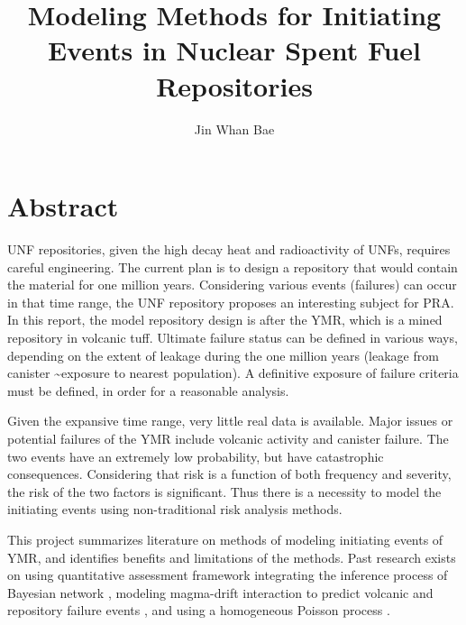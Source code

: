 \documentclass[12pt]{article}
\title{Modeling Methods for Initiating Events in Nuclear Spent Fuel Repositories}
\author{Jin Whan Bae}
\affil{Dept. of Nuclear, Plasma, and Radiological Engineering, University of Illinois at Urbana-Champaign
		  Urbana, IL}
\date{}                     %
\begin{document}
\maketitle

\section{Abstract}
\gls{UNF} repositories, given the high decay heat and radioactivity
of \glspl{UNF}, requires careful engineering. The current plan is
to design a repository that would contain the material for one million years.
Considering various events (failures) can occur in that time range,
the \gls{UNF} repository proposes an interesting subject for
\gls{PRA}. In this report, the model repository design is after the 
\gls{YMR}, which is a mined repository in volcanic tuff.
Ultimate failure status can be defined in various ways, depending on the
extent of leakage during the one million years (leakage from canister
\textasciitilde exposure to nearest population).
A definitive exposure of failure criteria must be defined,
in order for a reasonable analysis.  

Given the expansive
time range, very little real data is available.
Major issues or potential failures of the \gls{YMR} include volcanic activity
and canister failure. The two events have an extremely low
probability, but have catastrophic consequences. Considering that
risk is a function of both frequency and severity, the risk 
of the two factors is significant. Thus there is a necessity
to model the initiating events using non-traditional
risk analysis methods.

This project summarizes literature on methods of modeling
initiating events of \gls{YMR}, and identifies
benefits and limitations of the methods. Past research exists on using quantitative
assessment framework integrating the inference process
of Bayesian network \cite{lee_application_2006}, modeling
magma-drift interaction to predict volcanic and repository
failure events \cite{woods_modeling_2002}, and
using a homogeneous Poisson process \cite{ho_risk_1992}.
\end{document}
